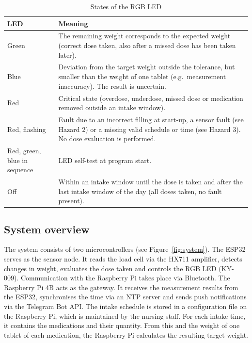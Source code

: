 \begin{table}[H]
	\centering
	\begin{tabular}{|l|p{}|}
		\hline
		\textbf{LED} & \textbf{Meaning} \\
		\hline\hline
		Green & The remaining weight corresponds to the expected weight (correct dose taken, also after a missed dose has been taken later). \\
		\hline
		Blue & Deviation from the target weight outside the tolerance, but smaller than the weight of one tablet (e.g.\ measurement inaccuracy). The result is uncertain. \\
		\hline
		Red & Critical state (overdose, underdose, missed dose or medication removed outside an intake window). \\
		\hline
		Red, flashing & Fault due to an incorrect filling at start-up, a sensor fault (see Hazard 2) or a missing valid schedule or time (see Hazard 3). No dose evaluation is performed. \\
		\hline
		Red, green, blue in sequence & LED self-test at program start. \\
		\hline
		Off & Within an intake window until the dose is taken and after the last intake window of the day (all doses taken, no fault present). \\
		\hline
	\end{tabular}
	\caption{States of the RGB LED}
	\label{tab:led}
\end{table}

\subsection{System overview}

The system consists of two microcontrollers (see
Figure~\ref{fig:system}). The ESP32 serves as the sensor node. It reads the
load cell via the HX711 amplifier, detects changes in weight, evaluates the
dose taken and controls the RGB LED (KY-009). Communication with the Raspberry
Pi takes place via Bluetooth. The Raspberry Pi 4B acts as the gateway. It
receives the measurement results from the ESP32, synchronises the time via an
NTP server and sends push notifications via the Telegram Bot API. The intake
schedule is stored in a configuration file on the Raspberry Pi, which is
maintained by the nursing staff. For each intake time, it contains the
medications and their quantity. From this and the weight of one tablet of each
medication, the Raspberry Pi calculates the resulting target weight.